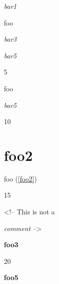 
\def\mytitle{HTML Blocks}


\emph{bar1}

foo

\emph{bar3}


\emph{bar5}

5

foo

\emph{bar5}

10

\part{foo2 }
\label{foo2}

foo (\autoref{foo2})

15

<!-- This is not a

\emph{comment} -->

\textbf{foo3}

20

\textbf{foo5}



